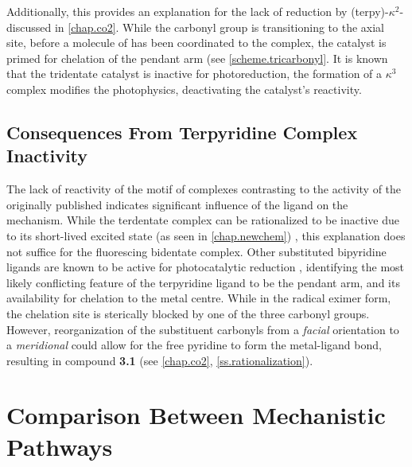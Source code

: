 Additionally, this provides an explanation for the lack of  reduction by (terpy)-$\kappa^2$- discussed in \autoref{chap.co2}. While the carbonyl group is transitioning to the axial site, before a molecule of  has been coordinated to the complex, the catalyst is primed for chelation of the pendant arm (see \autoref{scheme.tricarbonyl}. It is known that the tridentate catalyst is inactive for  photoreduction, the formation of a $\kappa^3$ complex modifies the photophysics, deactivating the catalyst's reactivity.

\FloatBarrier

\subsection{Consequences From \texorpdfstring{}{Bidentate} Terpyridine Complex Inactivity}

The  lack of reactivity of the  motif of complexes contrasting to the activity of the originally published  indicates significant influence of the ligand on the mechanism. While the terdentate complex can be rationalized to be inactive due to its short-lived excited state (as seen in \autoref{chap.newchem}) \autocite{shavaleev2004}, this explanation does not suffice for the fluorescing bidentate complex. Other substituted bipyridine ligands are known to be active for photocatalytic reduction \autocite{hawecker1986, kurz2006}, identifying the most likely conflicting feature of the terpyridine ligand to be the pendant arm, and its availability for chelation to the metal centre. While in the radical eximer form, the chelation site is sterically blocked by one of the three carbonyl groups. However, reorganization of the substituent carbonyls from a \textit{facial} orientation to a \textit{meridional} could allow for the free pyridine to form the metal-ligand bond, resulting in compound \textbf{3.1} (see \autoref{chap.co2}, \autoref{ss.rationalization}).

\section{Comparison Between Mechanistic Pathways} \label{sec.compare}

